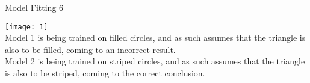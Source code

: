 \begin{questions}
	
	\begin{question}{Model Fitting }{6}		
	\begin{answer} 
	\texttt{[image: 1]}\\
	Model 1 is being trained on filled circles, and as such assumes that the triangle is also to be filled, coming to an incorrect result.\\
	Model 2 is being trained on striped circles, and as such assumes that the triangle is also to be striped, coming to the correct conclusion.
		
	\end{answer}
		
	\end{question}
	
\end{questions}

